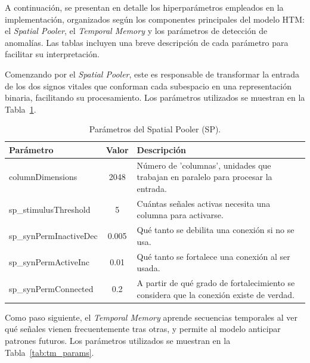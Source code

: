 A continuación, se presentan en detalle los hiperparámetros empleados en la implementación, organizados según los componentes principales del modelo HTM: el \textit{Spatial Pooler}, el \textit{Temporal Memory} y los parámetros de detección de anomalías. Las tablas incluyen una breve descripción de cada parámetro para facilitar su interpretación.

\medskip

Comenzando por el \textit{Spatial Pooler}, este es responsable de transformar la entrada de los dos signos vitales que conforman cada subespacio en una representación binaria, facilitando su procesamiento. Los parámetros utilizados se muestran en la Tabla~\ref{tab:spatial_pooler_params}.

\begin{table}[H]
  \centering
  \small
  \begin{tabular}{l c p{7cm}}
    \hline
    \textbf{Parámetro} & \textbf{Valor} & \textbf{Descripción} \\
    \hline
    columnDimensions & 2048 & Número de 'columnas', unidades que trabajan en paralelo para procesar la entrada. \\
    sp\_stimulusThreshold & 5 & Cuántas señales activas necesita una columna para activarse. \\
    sp\_synPermInactiveDec & 0.005 & Qué tanto se debilita una conexión si no se usa. \\
    sp\_synPermActiveInc & 0.01 & Qué tanto se fortalece una conexión al ser usada. \\
    sp\_synPermConnected & 0.2 & A partir de qué grado de fortalecimiento se considera que la conexión existe de verdad. \\
    \hline
  \end{tabular}
  \caption{Parámetros del Spatial Pooler (SP).}
  \label{tab:spatial_pooler_params}
\end{table}

\medskip

Como paso siguiente, el \textit{Temporal Memory} aprende secuencias temporales al ver qué señales vienen frecuentemente tras otras, y permite al modelo anticipar patrones futuros. Los parámetros utilizados se muestran en la Tabla~\ref{tab:tm_params}.

